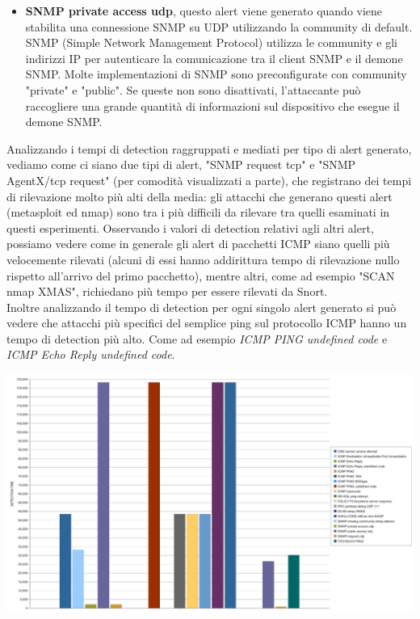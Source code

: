 \begin{itemize}
    \item \textbf{SNMP private access udp}, questo alert viene generato quando viene stabilita una connessione SNMP su UDP utilizzando la community di default. SNMP (Simple Network Management Protocol) utilizza le community e gli indirizzi IP per autenticare la comunicazione tra il client SNMP e il demone SNMP. Molte implementazioni di SNMP sono preconfigurate con community "private" e "public". Se queste non sono disattivati, l'attaccante può raccogliere una grande quantità di informazioni sul dispositivo che esegue il demone SNMP.

\end{itemize}

Analizzando i tempi di detection raggruppati e mediati per tipo di alert generato, vediamo come ci siano due tipi di alert, "SNMP request tcp" e "SNMP AgentX/tcp request" (per comodità visualizzati a parte), che registrano dei tempi di rilevazione molto più alti della media: gli attacchi che generano questi alert (metasploit ed nmap) sono tra i più difficili da rilevare tra quelli esaminati in questi esperimenti. Osservando i valori di detection relativi agli altri alert, possiamo vedere come in generale gli alert di pacchetti ICMP siano quelli più velocemente rilevati (alcuni di essi hanno addirittura tempo di rilevazione nullo rispetto all'arrivo del primo pacchetto), mentre altri, come ad esempio "SCAN nmap XMAS", richiedano più tempo per essere rilevati da Snort.\\
Inoltre analizzando il tempo di detection per ogni singolo alert generato si può vedere che attacchi più specifici del semplice ping sul protocollo ICMP hanno un tempo di detection più alto. Come ad esempio \textit{ICMP PING undefined code} e \textit{ICMP Echo Reply undefined code}.

\includegraphics[scale=0.3]{figure/detection_msg.jpg}\\

